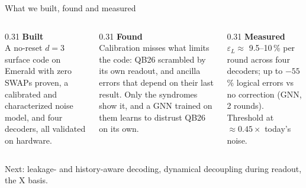 \documentclass[aspectratio=169,11pt]{beamer}
\newcommand{\eyebrow}[1]{{\color{accent}\scriptsize\bfseries\MakeUppercase{#1}}\par\smallskip}
\begin{document}
{
\begin{frame}{What we built, found and measured}
\color{paper}\eyebrow{Takeaways}
\begin{columns}[T]
\begin{column}{0.31\textwidth}
{\color{accent!80!white}\Large\bfseries Built}\\[4pt]
{\small\color{panel} A no-reset $d=3$ surface code on Emerald with zero SWAPs proven, a calibrated and characterized noise model, and four decoders, all validated on hardware.}
\end{column}
\begin{column}{0.31\textwidth}
{\color{accent!80!white}\Large\bfseries Found}\\[4pt]
{\small\color{panel} Calibration misses what limits the code: QB26 scrambled by its own readout, and ancilla errors that depend on their last result. Only the syndromes show it, and a GNN trained on them learns to distrust QB26 on its own.}
\end{column}
\begin{column}{0.31\textwidth}
{\color{accent!80!white}\Large\bfseries Measured}\\[4pt]
{\small\color{panel} $\varepsilon_L\approx$ 9.5--10\,\% per round across four decoders; up to $-55$\,\% logical errors vs no correction (GNN, 2 rounds). Threshold at $\approx0.45\times$ today's noise.}
\end{column}
\end{columns}
\vfill
{\footnotesize\color{panel} Next: leakage- and history-aware decoding, dynamical decoupling during readout, the X basis.}
\vspace*{1em}
\end{frame}}
\end{document}
